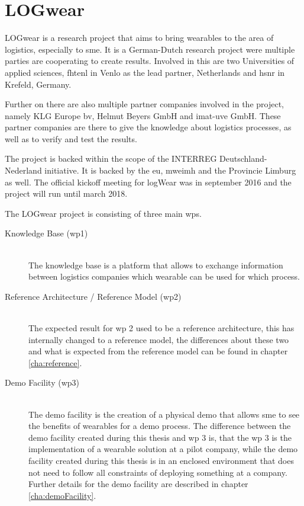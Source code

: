 \section{LOGwear}\label{sec:logwear}
LOGwear is a research project that aims to bring wearables to the area of logistics, especially to \gls{sme}. It is a German-Dutch research project were multiple parties are cooperating to create results. Involved in this are two Universities of applied sciences, \gls{fhtenl} in Venlo as the lead partner, Netherlands and \gls{hsnr} in Krefeld, Germany.

Further on there are also multiple partner companies involved in the project, namely KLG Europe bv, Helmut Beyers GmbH and imat-uve GmbH. These partner companies are there to give the knowledge about logistics processes, as well as to verify and test the results.

The project is backed within the scope of the INTERREG Deutschland-Nederland initiative. It is backed by the \gls{eu}, \gls{mweimh} and the Provincie Limburg as well. The official kickoff meeting for logWear was in september 2016 and the project will run until march 2018. 

The LOGwear project is consisting of three main \gls{wp}s. \citep{website:logwear}
\begin{description}
	\item[Knowledge Base (\gls{wp}1)] \hfill \\
		The knowledge base is a platform that allows to exchange information between logistics companies which wearable can be used for which process. \citep{bachelorThesis:oliver} \citep{bachelorThesis:sascha}
	\item[Reference Architecture / Reference Model (\gls{wp}2)] \hfill \\
		The expected result for \gls{wp} 2 used to be a reference architecture, this has internally changed to a reference model, the differences about these two and what is expected from the reference model can be found in chapter \ref{cha:reference}. 
	\item[Demo Facility (\gls{wp}3)] \hfill \\
		The demo facility is the creation of a physical demo that allows \gls{sme} to see the benefits of wearables for a demo process. The difference between the demo facility created during this thesis and \gls{wp} 3 is, that the \gls{wp} 3 is the implementation of a wearable solution at a pilot company, while the demo facility created during this thesis is in an enclosed environment that does not need to follow all constraints of deploying something at a company. Further details for the demo facility are described in chapter \ref{cha:demoFacility}. 
\end{description}